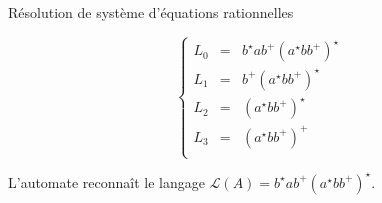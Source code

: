 \begin{frame}{Résolution de système d'équations rationnelles}
{    $$
    \left\{
    \begin{array}{rclclcl}
      L_0 &=& b^\star a b^+ (a^\star bb^+)^\star\\
      L_1 &=& b^+ (a^\star bb^+)^\star \\
      L_2 &=& (a^\star bb^+)^\star \\
      L_3 &=& (a^\star bb^+)^+\\
    \end{array}
    \right.
    $$

    \alert{L'automate reconnaît le langage $\mathcal{L}(A) = b^\star a b^+ (a^\star bb^+)^\star$.}
  }
\end{frame}

\endgroup
